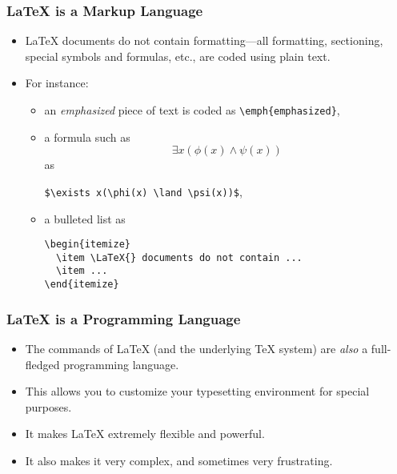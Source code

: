 \begin{frame}[fragile]
\frametitle{\LaTeX{} is a Markup Language}

\begin{itemize}
\item \LaTeX{} documents do not contain formatting---all formatting,
  sectioning, special symbols and formulas, etc., are coded using
  plain text.
\item For instance:
  \begin{itemize}
    \item an \emph{emphasized} piece of text is coded as
      \verb+\emph{emphasized}+,
    \item a formula such as \[\exists x(\phi(x) \land \psi(x))\] as
      \begin{center}
      \verb+$\exists x(\phi(x) \land \psi(x))$+,
      \end{center}
    \item a bulleted list as 
\begin{verbatim}
\begin{itemize}
  \item \LaTeX{} documents do not contain ...
  \item ...
\end{itemize}
\end{verbatim}
  \end{itemize}
\end{itemize}

\end{frame}

\begin{frame}
\frametitle{\LaTeX{} is a Programming Language}

\begin{itemize}
\item The commands of \LaTeX{} (and the underlying \TeX{} system) are
  \emph{also} a full-fledged programming language.
\item This allows you to customize your typesetting environment for
  special purposes.
\item It makes \LaTeX{} extremely flexible and powerful.
\item It also makes it very complex, and sometimes very frustrating.
\end{itemize}
\end{frame}

